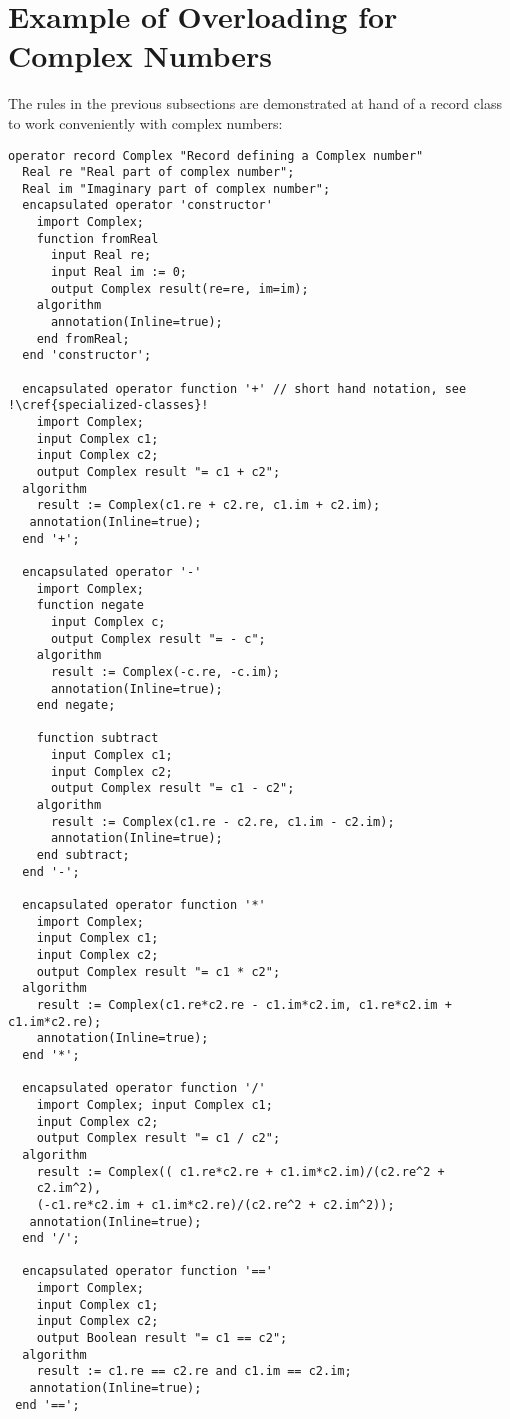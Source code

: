 \section{Example of Overloading for Complex Numbers}\label{example-of-overloading-for-complex-numbers}

\begin{example}
The rules in the previous subsections are demonstrated at hand
of a record class to work conveniently with complex numbers:
\begin{lstlisting}[language=modelica,escapechar=!]
operator record Complex "Record defining a Complex number"
  Real re "Real part of complex number";
  Real im "Imaginary part of complex number";
  encapsulated operator 'constructor'
    import Complex;
    function fromReal
      input Real re;
      input Real im := 0;
      output Complex result(re=re, im=im);
    algorithm
      annotation(Inline=true);
    end fromReal;
  end 'constructor';

  encapsulated operator function '+' // short hand notation, see !\cref{specialized-classes}!
    import Complex;
    input Complex c1;
    input Complex c2;
    output Complex result "= c1 + c2";
  algorithm
    result := Complex(c1.re + c2.re, c1.im + c2.im);
   annotation(Inline=true);
  end '+';

  encapsulated operator '-'
    import Complex;
    function negate
      input Complex c;
      output Complex result "= - c";
    algorithm
      result := Complex(-c.re, -c.im);
      annotation(Inline=true);
    end negate;

    function subtract
      input Complex c1;
      input Complex c2;
      output Complex result "= c1 - c2";
    algorithm
      result := Complex(c1.re - c2.re, c1.im - c2.im);
      annotation(Inline=true);
    end subtract;
  end '-';

  encapsulated operator function '*'
    import Complex;
    input Complex c1;
    input Complex c2;
    output Complex result "= c1 * c2";
  algorithm
    result := Complex(c1.re*c2.re - c1.im*c2.im, c1.re*c2.im + c1.im*c2.re);
    annotation(Inline=true);
  end '*';

  encapsulated operator function '/'
    import Complex; input Complex c1;
    input Complex c2;
    output Complex result "= c1 / c2";
  algorithm
    result := Complex(( c1.re*c2.re + c1.im*c2.im)/(c2.re^2 +
    c2.im^2),
    (-c1.re*c2.im + c1.im*c2.re)/(c2.re^2 + c2.im^2));
   annotation(Inline=true);
  end '/';

  encapsulated operator function '=='
    import Complex;
    input Complex c1;
    input Complex c2;
    output Boolean result "= c1 == c2";
  algorithm
    result := c1.re == c2.re and c1.im == c2.im;
   annotation(Inline=true);
 end '==';


\end{lstlisting}
\end{example}
